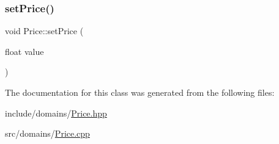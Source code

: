 \mbox{\label{class_price_a66ba29e9ab95f10b5d21b171317045c3}} 
\subsubsection{\texorpdfstring{setPrice()}{setPrice()}}
{\footnotesize\ttfamily void Price\+::set\+Price (\begin{DoxyParamCaption}\item[{float}]{value }\end{DoxyParamCaption})}



The documentation for this class was generated from the following files\+:\begin{DoxyCompactItemize}
\item 
include/domains/\mbox{\hyperlink{_price_8hpp}{Price.\+hpp}}\item 
src/domains/\mbox{\hyperlink{_price_8cpp}{Price.\+cpp}}\end{DoxyCompactItemize}
